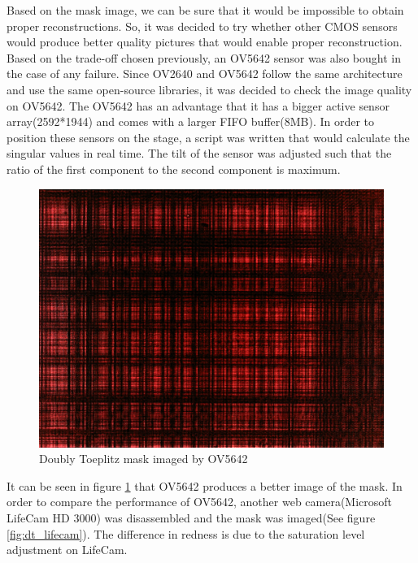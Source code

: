 Based on the mask image, we can be sure that it would be impossible to obtain proper reconstructions. So, it was decided to try whether other CMOS sensors would produce better quality pictures that would enable proper reconstruction. Based on the trade-off chosen previously, an OV5642 sensor was also bought in the case of any failure. Since OV2640 and OV5642 follow the same architecture and use the same open-source libraries, it was decided to check the image quality on OV5642. The OV5642 has an advantage that it has a bigger active sensor array(2592*1944) and comes with a larger FIFO buffer(8MB). In order to position these sensors on the stage, a script was written that would calculate the singular values in real time. The tilt of the sensor was adjusted such that the ratio of the first component to the second component is maximum. 
\begin{figure}[h]
\centering
\includegraphics[scale=0.125]{pics/slm/ov5642dtmask.jpg}
\caption{Doubly Toeplitz mask imaged by OV5642}
\label{fig:dt_ov5642}
\end{figure}
It can be seen in figure \ref{fig:dt_ov5642} that OV5642 produces a better image of the mask. In order to compare the performance of OV5642, another web camera(Microsoft LifeCam HD 3000) was disassembled and the mask was imaged(See figure \ref{fig:dt_lifecam}). The difference in redness is due to the saturation level adjustment on LifeCam.
